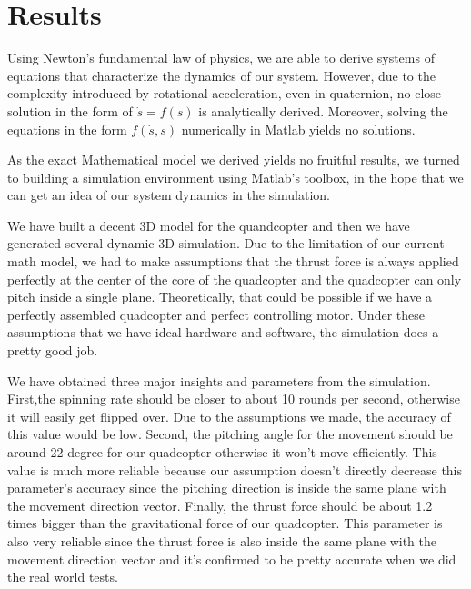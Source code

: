 \section{Results}
Using Newton's fundamental law of physics, we are able to derive systems of equations that characterize the dynamics of our system. However, due to the complexity introduced by rotational acceleration, even in quaternion, no close-solution in the form of $\dot{s} = f(s)$ is analytically derived. Moreover, solving the equations in the form $f(\dot{s},s)$ numerically in Matlab yields no solutions. \par
As the exact Mathematical model we derived yields no fruitful results, we turned to building a simulation environment using Matlab's toolbox, in the hope that we can get an idea of our system dynamics in the simulation. \par
We have built a decent 3D model for the quandcopter and then we have generated several dynamic 3D simulation. Due to the limitation of our current math model, we had to make assumptions that the thrust force is always applied perfectly at the center of the core of the quadcopter and the quadcopter can only pitch inside a single plane. Theoretically, that could be possible if we have a perfectly assembled quadcopter and perfect controlling motor. Under these assumptions that we have ideal hardware and software, the simulation does a pretty good job.\par
We have obtained three major insights and parameters from the simulation. First,the spinning rate should be closer to about 10 rounds per second, otherwise it will easily get flipped over. Due to the assumptions we made, the accuracy of this value would be low. Second, the pitching angle for the movement should be around 22 degree for our quadcopter otherwise it won't move efficiently. This value is much more reliable because our assumption doesn't directly decrease this parameter's accuracy since the pitching direction is inside the same plane with the movement direction vector. Finally, the thrust force should be about 1.2 times bigger than the gravitational force of our quadcopter. This parameter is also very reliable since the thrust force is also inside the same plane with the movement direction vector and it's confirmed to be pretty accurate when we did the real world tests.\par

